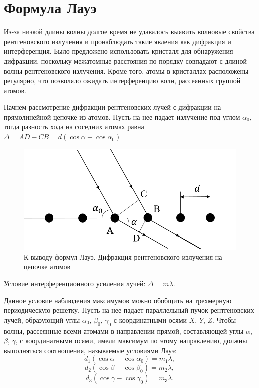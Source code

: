 \documentclass[12pt]{kiarticle} %
\begin{document}
\section{Формула Лауэ}
Из-за низкой длины волны долгое время не удавалось выявить волновые свойства рентгеновского излучения и пронаблюдать такие явления как дифракция и интерференция. Было предложено использовать кристалл для обнаружения дифракции, поскольку межатомные расстояния по порядку совпадают с длиной волны рентгеновского излучения. Кроме того, атомы в кристаллах расположены регулярно, что позволяло ожидать интерференцию волн, рассеянных группой атомов.

Начнем рассмотрение дифракции рентгеновских лучей с дифракции на прямолинейной цепочке из атомов. Пусть на нее падает излучение под углом $\alpha_0$, тогда разность хода на соседних атомах равна $\Delta = AD - CB = d (\cos \alpha - \cos \alpha_0)$

\begin{figure}
    \vspace{-20pt}
	\includegraphics[width=\linewidth]{pic1.png}
	\vspace{-20pt}
	\caption{К выводу формул Лауэ. Дифракция рентгеновского излучения на цепочке атомов}
	\label{ris 1}
\end{figure}

Условие интерференционного усиления лучей: $\Delta = m \lambda$.

Данное условие наблюдения максимумов можно обобщить на трехмерную периодическую решетку. Пусть на нее падает параллельный пучок рентгеновских лучей, образующий углы $\alpha_0$, $\beta_0$, $\gamma_0$ с координатными осями $X$, $Y$, $Z$. Чтобы волны, рассеянные всеми атомами в направлении прямой, составляющей углы $\alpha$, $\beta$, $\gamma$, с координатными осями, имели максимум по этому направлению, должны выполняться соотношения, называемые условиями Лауэ:
\begin{equation*}
    d_1 ( \cos \alpha - \cos \alpha_0) = m_1 \lambda,
\end{equation*}
\begin{equation*}
    d_2 ( \cos \beta - \cos \beta_0) = m_2 \lambda,
\end{equation*}
\begin{equation*}
    d_3 ( \cos \gamma - \cos \gamma_0) = m_3 \lambda.
\end{equation*}
\end{document}
